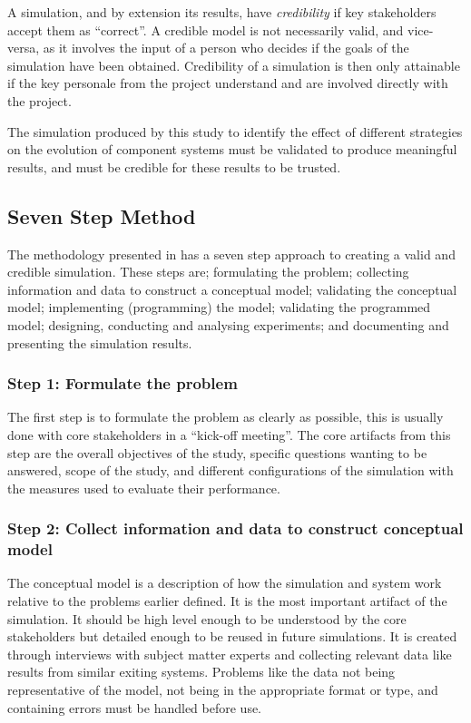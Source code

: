 A simulation, and by extension its results, have \textit{credibility} if key stakeholders accept them as ``correct''.
A credible model is not necessarily valid, and vice-versa, as it involves the input of a person who decides if the goals of the simulation have been obtained.
Credibility of a simulation is then only attainable if the key personale from the project understand and are involved directly with the project.

The simulation produced by this study to identify the effect of different strategies on the evolution of component systems must be validated to produce meaningful results,
and must be credible for these results to be trusted.

\subsection{Seven Step Method}
The methodology presented in \cite{Law2005} has a seven step approach to creating a valid and credible simulation.
These steps are; formulating the problem; collecting information and data to construct a conceptual model; validating the conceptual model;
implementing (programming) the model; validating the programmed model; designing, conducting and analysing experiments; and documenting and presenting the simulation results.

\subsubsection{Step 1: Formulate the problem}
The first step is to formulate the problem as clearly as possible, this is usually done with core stakeholders in a ``kick-off meeting''.
The core artifacts from this step are the overall objectives of the study, specific questions wanting to be answered, scope of the study,
 and different configurations of the simulation with the measures used to evaluate their performance. 

\subsubsection{Step 2: Collect information and data to construct conceptual model}
The conceptual model is a description of how the simulation and system work relative to the problems earlier defined.
It is the most important artifact of the simulation.
It should be high level enough to be understood by the core stakeholders but detailed enough to be reused in future simulations.
It is created through interviews with subject matter experts and collecting relevant data like results from similar exiting systems.
Problems like the data not being representative of the model, not being in the appropriate format or type, and containing errors must be handled before use.

